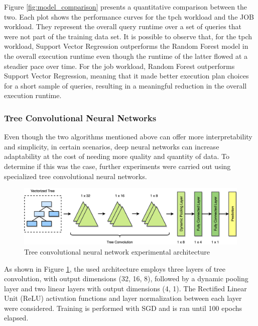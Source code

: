 Figure \ref{fig:model_comparison} presents a quantitative comparison between the two. Each plot shows the performance curves for the \gls{tpch} workload and the JOB workload. They represent the overall query runtime over a set of queries that were not part of the training data set. It is possible to observe that, for the \gls{tpch} workload, Support Vector Regression outperforms the Random Forest model in the overall execution runtime even though the runtime of the latter flowed at a steadier pace over time. For the \gls{job} workload, Random Forest outperforms Support Vector Regression, meaning that it made better execution plan choices for a short sample of queries, resulting in a meaningful reduction in the overall execution runtime.

\subsubsection{Tree Convolutional Neural Networks}

Even though the two algorithms mentioned above can offer more interpretability and simplicity, in certain scenarios, deep neural networks can increase adaptability at the cost of needing more quality and quantity of data. To determine if this was the case, further experiments were carried out using specialized tree convolutional neural networks.

\begin{figure}[H]
\centering
\includegraphics[width=\textwidth]{img/performance_evaluation/tcnn_architecture.png}
\caption{Tree convolutional neural network experimental architecture}
\label{fig:tcnn_experimental_architecture}
\end{figure}

As shown in Figure \ref{fig:tcnn_experimental_architecture}, the used architecture employs three layers of tree convolution, with output dimensions (32, 16, 8), followed by a dynamic pooling layer and two linear layers with output dimensions (4, 1). The Rectified Linear Unit (ReLU) activation functions and layer normalization between each layer were considered. Training is performed with SGD and is ran until 100 epochs elapsed.

